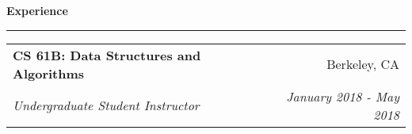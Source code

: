 \documentclass[11pt,letterpaper]{article}
\makeatletter
\newenvironment{topic}[1]
    {
    {\Large \centerline{#1}}
    \vspace*{0.03in}
    \hrule 
    \vspace*{0.05in}
    }
    {}
\newenvironment{event}
    {
    \begin{tabular*}{\textwidth}{l@{\extracolsep{\fill}}r}
    }
    {
    \end{tabular*}
    }
\makeatother
\begin{document}
\begin{topic}{\textbf{Experience}}
        \begin{event}
            \textbf{CS 61B: Data Structures and Algorithms} & Berkeley, CA \\
            \emph{Undergraduate Student Instructor} & \emph{January 2018 - May 2018}
        \end{event}
    \end{topic} 
\end{document}
